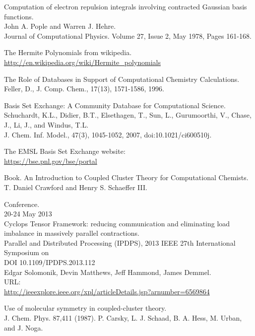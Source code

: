 \documentclass[a4paper,norsk,11pt,twoside]{report}
\begin{document}
\begin{thebibliography}{}
Computation of electron repulsion integrals involving contracted Gaussian basis functions. \\
John A. Pople and Warren J. Hehre. \\
Journal of Computational Physics. Volume 27, Issue 2, May 1978, Pages 161-168.

The Hermite Polynomials from wikipedia. \\
\url{http://en.wikipedia.org/wiki/Hermite_polynomials}

The Role of Databases in Support of Computational Chemistry Calculations. \\
Feller, D., J. Comp. Chem., 17(13), 1571-1586, 1996. 

Basis Set Exchange: A Community Database for Computational Science. \\
Schuchardt, K.L., Didier, B.T., Elsethagen, T., Sun, L., Gurumoorthi, V., Chase, J., Li, J., and Windus, T.L.\\
J. Chem. Inf. Model., 47(3), 1045-1052, 2007, doi:10.1021/ci600510j.

The EMSL Basis Set Exchange website: \\
\url{https://bse.pnl.gov/bse/portal}

Book. An Introduction to Coupled Cluster Theory for Computational Chemists. \\
T. Daniel Crawford and Henry S. Schaeffer III. 

Conference. \\
20-24 May 2013 \\ 
Cyclops Tensor Framework: reducing communication and eliminating load imbalance in massively parallel contractions. \\
Parallel and Distributed Processing (IPDPS), 2013 IEEE 27th International Symposium on \\
DOI 10.1109/IPDPS.2013.112 \\
Edgar Solomonik, Devin Matthews, Jeff Hammond, James Demmel. \\
URL: \\ \url{http://ieeexplore.ieee.org/xpl/articleDetails.jsp?arnumber=6569864}

Use of molecular symmetry in coupled-cluster theory. \\
J. Chem. Phys. 87,411 (1987).
P. Carsky, L. J. Schaad, B. A. Hess, M. Urban, and J. Noga.


\end{thebibliography}
\end{document}

